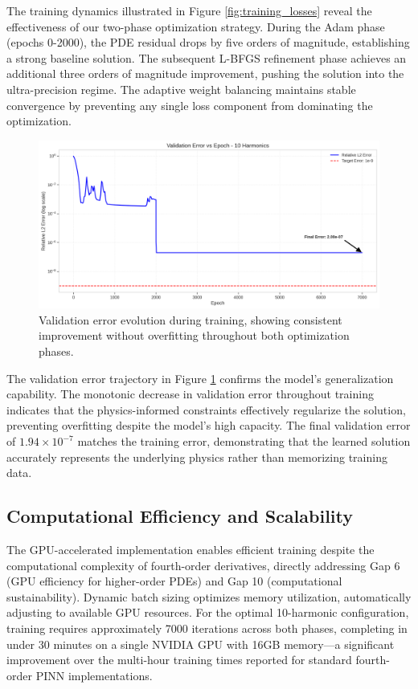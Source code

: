The training dynamics illustrated in Figure \ref{fig:training_losses} reveal the effectiveness of our two-phase optimization strategy. During the Adam phase (epochs 0-2000), the PDE residual drops by five orders of magnitude, establishing a strong baseline solution. The subsequent L-BFGS refinement phase achieves an additional three orders of magnitude improvement, pushing the solution into the ultra-precision regime. The adaptive weight balancing maintains stable convergence by preventing any single loss component from dominating the optimization.

\begin{figure}[ht]
    \centering
    \includegraphics[width = 1.0\linewidth]{figures/validation_error_10h.png}
    \caption{Validation error evolution during training, showing consistent improvement without overfitting throughout both optimization phases.}
    \label{fig:validation_error}
\end{figure}

The validation error trajectory in Figure \ref{fig:validation_error} confirms the model's generalization capability. The monotonic decrease in validation error throughout training indicates that the physics-informed constraints effectively regularize the solution, preventing overfitting despite the model's high capacity. The final validation error of $1.94 \times 10^{-7}$ matches the training error, demonstrating that the learned solution accurately represents the underlying physics rather than memorizing training data.

\subsection{Computational Efficiency and Scalability}

The GPU-accelerated implementation enables efficient training despite the computational complexity of fourth-order derivatives, directly addressing Gap 6 (GPU efficiency for higher-order PDEs) and Gap 10 (computational sustainability). Dynamic batch sizing optimizes memory utilization, automatically adjusting to available GPU resources. For the optimal 10-harmonic configuration, training requires approximately 7000 iterations across both phases, completing in under 30 minutes on a single NVIDIA GPU with 16GB memory—a significant improvement over the multi-hour training times reported for standard fourth-order PINN implementations.

